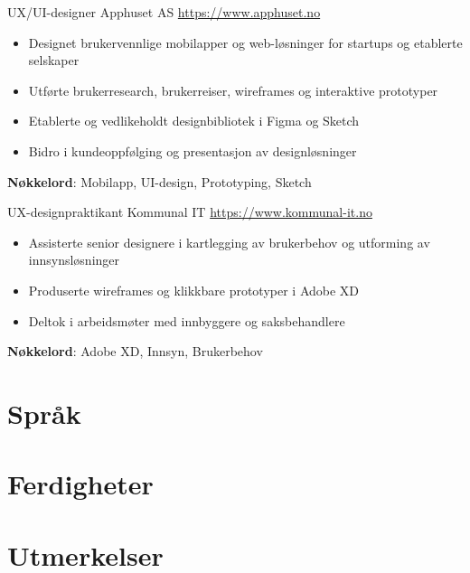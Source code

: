 \documentclass[a4paper, serif, 10pt]{moderncv}
\begin{document}
        {UX/UI-designer}
        {Apphuset AS}
        {\url{https://www.apphuset.no}}
        {}
        {\begin{itemize}
\item Designet brukervennlige mobilapper og web-løsninger for startups og etablerte selskaper
\item Utførte brukerresearch, brukerreiser, wireframes og interaktive prototyper
\item Etablerte og vedlikeholdt designbibliotek i Figma og Sketch
\item Bidro i kundeoppfølging og presentasjon av designløsninger
\end{itemize}
\textbf{Nøkkelord}: Mobilapp, UI-design, Prototyping, Sketch}

        {UX-designpraktikant}
        {Kommunal IT}
        {\url{https://www.kommunal-it.no}}
        {}
        {\begin{itemize}
\item Assisterte senior designere i kartlegging av brukerbehov og utforming av innsynsløsninger
\item Produserte wireframes og klikkbare prototyper i Adobe XD
\item Deltok i arbeidsmøter med innbyggere og saksbehandlere
\end{itemize}
\textbf{Nøkkelord}: Adobe XD, Innsyn, Brukerbehov}
\section{Språk}

\section{Ferdigheter}

\section{Utmerkelser}
\end{document}
